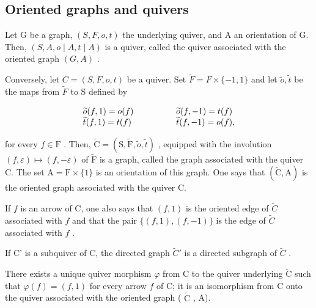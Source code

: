 \subsection{Oriented graphs and quivers}

Let G be a graph, \((S,F,o,t)\) the underlying quiver, and A an orientation of G. Then, \((S,A,o\mid A,t\mid A)\) is a quiver, called the quiver associated with the oriented graph \((G,A)\) .

Conversely, let \(C = (S, F, o, t)\) be a quiver. Set \(\widetilde{F} = F \times \{-1, 1\}\) and let \(\widetilde{o}, \widetilde{t}\) be the maps from \(\widetilde{F}\) to S defined by

\[
\begin{array}{l l} \widetilde {o} (f, 1) = o (f) & \qquad \qquad \widetilde {o} (f, - 1) = t (f) \\ \widetilde {t} (f, 1) = t (f) & \qquad \qquad \widetilde {t} (f, - 1) = o (f), \end{array}
\]

for every \(f \in \mathrm{F}\) . Then, \(\widetilde{\mathrm{C}} = (\mathrm{S}, \widetilde{\mathrm{F}}, \widetilde{o}, \widetilde{t})\) , equipped with the involution \((f, \varepsilon) \mapsto (f, -\varepsilon)\) of \(\widetilde{\mathrm{F}}\) is a graph, called the graph associated with the quiver C. The set \(\mathrm{A} = \mathrm{F} \times \{1\}\) is an orientation of this graph. One says that \((\widetilde{\mathrm{C}}, \mathrm{A})\) is the oriented graph associated with the quiver C.

If \(f\) is an arrow of C, one also says that \((f,1)\) is the oriented edge of \(\widetilde{C}\) associated with \(f\) and that the pair \(\{(f,1),(f,-1)\}\) is the edge of \(\widetilde{C}\) associated with \(f\) .

If C' is a subquiver of C, the directed graph \(\widetilde{C}'\) is a directed subgraph of \(\widetilde{C}\) .

There exists a unique quiver morphism \(\varphi\) from C to the quiver underlying \(\widetilde{\mathrm{C}}\) such that \(\varphi(f) = (f,1)\) for every arrow \(f\) of C; it is an isomorphism from C onto the quiver associated with the oriented graph ( \(\widetilde{\mathrm{C}}\) , A).

